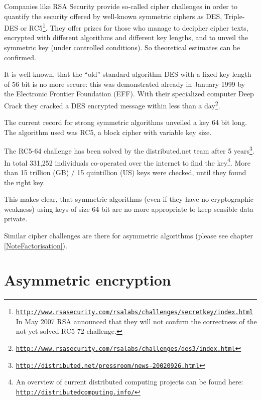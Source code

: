 Companies like RSA Security provide so-called cipher challenges in order to quantify the security offered by well-known symmetric ciphers as DES, Triple-DES or RC5\footnote{\href{http://www.rsasecurity.com/rsalabs/challenges/secretkey/index.html}{\tt http://www.rsasecurity.com/rsalabs/challenges/secretkey/index.html}\\
In May 2007 RSA announced that they will not confirm the correctness of the not yet solved RC5-72 challenge.}. They offer prizes for those who manage to decipher cipher texts, encrypted with different algorithms and different key lengths, and to unveil the symmetric key (under controlled conditions). So theoretical estimates can be confirmed.

It is well-known, that the ``old'' standard algorithm DES with a fixed key length of 56 bit is no more secure: this was demonstrated already in January 1999 by the Electronic Frontier Foundation (EFF). With their specialized computer Deep Crack they cracked a DES encrypted message within less than a day\footnote{\href{http://www.rsasecurity.com/rsalabs/challenges/des3/index.html}{\tt http://www.rsasecurity.com/rsalabs/challenges/des3/index.html}}.

The current record for strong symmetric algorithms unveiled a key 64 bit long. The algorithm used was RC5, a block cipher with variable key size. 

The RC5-64 challenge has been solved by the distributed.net team after 5 years\footnote{\href{http://distributed.net/pressroom/news-20020926.html}{\tt http://distributed.net/pressroom/news-20020926.html}}.  In total 331,252 individuals co-operated over the internet to find the key\footnote{%
An overview of current distributed computing projects can be found here:\\
\href{http://distributedcomputing.info/}{\tt http://distributedcomputing.info/}
}. More than 15 trillion (GB) / 15 quintillion (US)  keys were checked, until they found the right key.

This makes clear, that symmetric algorithms (even if they have no cryptographic weakness) using keys of size 64 bit are no more appropriate to keep sensible data private.

Similar cipher challenges are there for asymmetric algorithms (please see chapter \ref{NoteFactorisation}).




\section[Asymmetric encryption]
{Asymmetric encryption\footnotemark}

